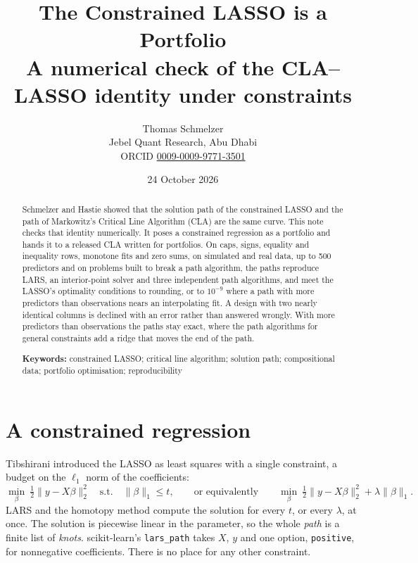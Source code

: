 \documentclass[11pt]{article}
\title{The Constrained LASSO is a Portfolio\\[6pt]
{\normalsize A numerical check of the CLA--LASSO identity under constraints}}
\author{Thomas Schmelzer\\[2pt]
{\small Jebel Quant Research, Abu Dhabi}\\[1pt]
{\small ORCID \href{https://orcid.org/0009-0009-9771-3501}{0009-0009-9771-3501}}}
\date{24 October 2026}
\theoremstyle{remark}
\begin{document}
\maketitle

\begin{abstract}
Schmelzer and Hastie showed that the solution path of the constrained LASSO and the
path of Markowitz's Critical Line Algorithm (CLA) are the same curve. This note checks
that identity numerically. It poses a constrained regression as a portfolio and hands
it to a released CLA written for portfolios. On caps, signs, equality and inequality
rows, monotone fits and zero sums, on simulated and real data, up to 500 predictors and
on problems built to break a path algorithm, the paths reproduce LARS, an interior-point
solver and three independent path algorithms, and meet the LASSO's optimality
conditions to rounding, or to $10^{-9}$ where a path with more predictors than
observations nears an interpolating fit. A design with two nearly identical columns is
declined with an error rather than answered wrongly. With more predictors than
observations the paths stay exact, where the path algorithms for general constraints add a ridge that moves
the end of the path.

\medskip\noindent
\textbf{Keywords:} constrained LASSO; critical line algorithm; solution path;
compositional data; portfolio optimisation; reproducibility
\end{abstract}

\section{A constrained regression}
\label{sec:example}

Tibshirani \cite{tibshirani1996} introduced the LASSO as least squares with a single
constraint, a budget on the $\ell_1$ norm of the coefficients:
\[
\min_\beta\ \tfrac12\|y-X\beta\|_2^2\quad\text{s.t.}\quad\|\beta\|_1\le t,
\qquad\text{or equivalently}\qquad
\min_\beta\ \tfrac12\|y-X\beta\|_2^2+\lambda\|\beta\|_1 .
\]
LARS \cite{efron2004} and the homotopy method \cite{osborne2000} compute the solution
for every $t$, or every $\lambda$, at once. The solution is piecewise linear in the
parameter, so the whole \emph{path} is a finite list of \emph{knots}. scikit-learn's
\texttt{lars\_path} \cite{sklearn} takes $X$, $y$ and one option, \texttt{positive},
for nonnegative coefficients. There is no place for any other constraint.
\end{document}
